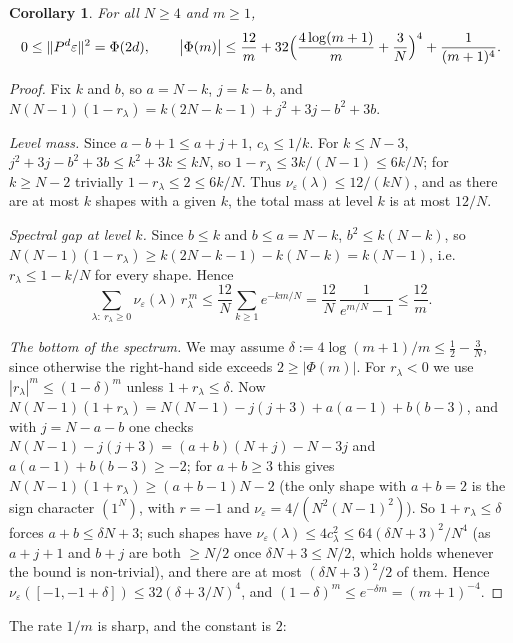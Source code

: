 \documentclass[11pt]{amsart}
\newtheorem{corollary}[theorem]{Corollary}
\theoremstyle{remark}
\begin{document}
\begin{corollary}\label{cor:bound}
For all $N\ge4$ and $m\ge1$,
\[
0\le\|P^d\varepsilon\|^2=\Phi(2d),
\qquad
\bigl|\Phi(m)\bigr|\le\frac{12}{m}+32\Bigl(\frac{4\log(m+1)}{m}+\frac3N\Bigr)^{4}+\frac1{(m+1)^4}.
\]
\end{corollary}

\begin{proof}
Fix $k$ and $b$, so $a=N-k$, $j=k-b$, and $N(N-1)(1-r_\lambda)=k(2N-k-1)+j^2+3j-b^2+3b$.

\emph{Level mass.}  Since $a-b+1\le a+j+1$, $c_\lambda\le1/k$.  For $k\le N-3$, $j^2+3j-b^2+3b\le k^2+3k\le kN$, so $1-r_\lambda\le3k/(N-1)\le6k/N$; for $k\ge N-2$ trivially $1-r_\lambda\le2\le6k/N$.  Thus $\nu_\varepsilon(\lambda)\le12/(kN)$, and as there are at most $k$ shapes with a given $k$, the total mass at level $k$ is at most $12/N$.

\emph{Spectral gap at level $k$.}  Since $b\le k$ and $b\le a=N-k$, $b^2\le k(N-k)$, so $N(N-1)(1-r_\lambda)\ge k(2N-k-1)-k(N-k)=k(N-1)$, i.e.\ $r_\lambda\le1-k/N$ for every shape.  Hence
\[
\sum_{\lambda:\ r_\lambda\ge0}\nu_\varepsilon(\lambda)\,r_\lambda^{\,m}\le\frac{12}N\sum_{k\ge1}e^{-km/N}=\frac{12}{N}\,\frac1{e^{m/N}-1}\le\frac{12}m .
\]

\emph{The bottom of the spectrum.}  We may assume $\delta:=4\log(m+1)/m\le\tfrac12-\tfrac3N$, since otherwise the right-hand side exceeds $2\ge|\Phi(m)|$.  For $r_\lambda<0$ we use $|r_\lambda|^m\le(1-\delta)^m$ unless $1+r_\lambda\le\delta$.  Now $N(N-1)(1+r_\lambda)=N(N-1)-j(j+3)+a(a-1)+b(b-3)$, and with $j=N-a-b$ one checks $N(N-1)-j(j+3)=(a+b)(N+j)-N-3j$ and $a(a-1)+b(b-3)\ge-2$; for $a+b\ge3$ this gives $N(N-1)(1+r_\lambda)\ge(a+b-1)N-2$ (the only shape with $a+b=2$ is the sign character $(1^N)$, with $r=-1$ and $\nu_\varepsilon=4/(N^2(N-1)^2)$).  So $1+r_\lambda\le\delta$ forces $a+b\le\delta N+3$; such shapes have $\nu_\varepsilon(\lambda)\le4c_\lambda^2\le64(\delta N+3)^2/N^4$ (as $a+j+1$ and $b+j$ are both $\ge N/2$ once $\delta N+3\le N/2$, which holds whenever the bound is non-trivial), and there are at most $(\delta N+3)^2/2$ of them.  Hence $\nu_\varepsilon([-1,-1+\delta])\le32(\delta+3/N)^4$, and $(1-\delta)^m\le e^{-\delta m}=(m+1)^{-4}$.
\end{proof}

The rate $1/m$ is sharp, and the constant is $2$:
\end{document}
